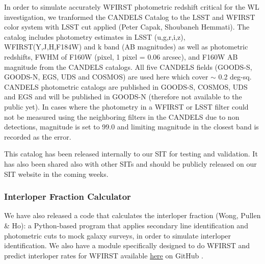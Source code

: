In order to simulate accurately WFIRST photometric redshift critical for the WL investigation, we tranformed the CANDELS Catalog to the LSST and WFIRST color system with LSST cut applied (Peter Capak, Shoubaneh Hemmati). The catalog includes photometry estimates in LSST (u,g,r,i,z), WFIRST(Y,J,H,F184W) and k band (AB magnitudes) as well as photometric redshifts, FWHM of F160W (pixel, 1 pixel = 0.06 arcsec), and F160W AB magnitude from the CANDELS catalogs. All five CANDELS fields (GOODS-S, GOODS-N, EGS, UDS and COSMOS) are used here which cover $\sim$ 0.2 deg-sq. CANDELS photometric catalogs are published in GOODS-S, COSMOS, UDS and EGS and will be published in GOODS-N (therefore not available to the public yet). In cases where the photometry in a WFIRST or LSST filter could not be measured using the neighboring filters in the CANDELS due to non detections, magnitude is set to 99.0 and limiting magnitude in the closest band is recorded as the error.

This catalog has been released internally to our SIT for testing and validation. It has also been shared also with other SITs and should be publicly released on our SIT website in the coming weeks.

\subsubsection{Interloper Fraction Calculator}

 We have also released a code that calculates the interloper fraction (Wong, Pullen \& Ho): a Python-based program that applies secondary line identification and photometric cuts to mock galaxy surveys, in order to simulate interloper identification.  We also have a module specifically designed to do WFIRST and predict interloper rates for WFIRST available  \href{https://github.com/kazewong/Intercut}{here} on GitHub \citep{Wong:2016eku}.
